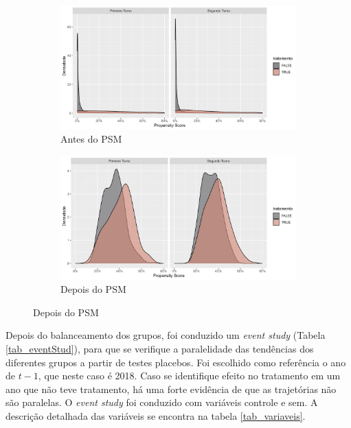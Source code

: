 \begin{figure}[!ht]
  \caption{Balanceamento dos grupos antes e depois do \textit{Propensity Score Matching} (PSM)}
    \begin{subfigure}[t]{0.49\linewidth}
      \includegraphics[width = \linewidth]{relatorios/passe-livre/graficos/pre-propensity.png}
      \caption{Antes do PSM}
      \label{fig_prePSM}
    \end{subfigure}
    \hfill
    \begin{subfigure}[t]{0.49\linewidth}
      \includegraphics[width = \linewidth]{relatorios/passe-livre/graficos/pos-propensity.png}
      \caption{Depois do PSM}
      \label{fig_posPSM}
    \end{subfigure}
    \label{fig_balanceamento}
  \end{figure}

Depois do balanceamento dos grupos, foi conduzido um \textit{event study} (Tabela \ref{tab_eventStud}), para que se verifique a paralelidade das tendências dos diferentes grupos a partir de testes placebos. Foi escolhido como referência o ano de $t-1$, que neste caso é 2018. Caso se identifique efeito no tratamento em um ano que não teve tratamento, há uma forte evidência de que as trajetórias não são paralelas. O \textit{event study} foi conduzido com variáveis controle e sem. A descrição detalhada das variáveis se encontra na tabela \ref{tab_variaveis}.

